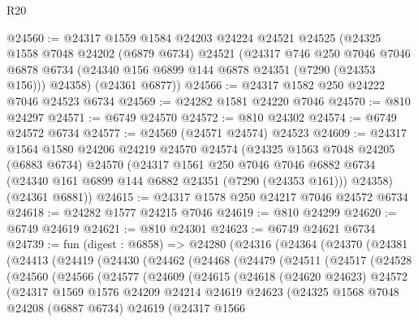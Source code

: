\begin{lexlean}{R20}
\begin{coremodule}
{@24560 := @24317
    @1559
    @1584
    @24203
    @24224
    @24521
    @24525
    (@24325
      @1558
      @7048
      @24202
      (@6879 @6734)
      @24521
      (@24317
        @746
        @250
        @7046
        @7046
        @6878
        @6734
        (@24340 @156 @6899 @144 @6878 @24351 (@7290 (@24353 @156)))
        @24358)
      (@24361 @6877))
@24566 := @24317 @1582 @250 @24222 @7046 @24523 @6734
@24569 := @24282 @1581 @24220 @7046
@24570 := @810 @24297
@24571 := @6749 @24570
@24572 := @810 @24302
@24574 := @6749 @24572 @6734
@24577 := @24569 (@24571 @24574) @24523
@24609 := @24317
    @1564
    @1580
    @24206
    @24219
    @24570
    @24574
    (@24325
      @1563
      @7048
      @24205
      (@6883 @6734)
      @24570
      (@24317
        @1561
        @250
        @7046
        @7046
        @6882
        @6734
        (@24340 @161 @6899 @144 @6882 @24351 (@7290 (@24353 @161)))
        @24358)
      (@24361 @6881))
@24615 := @24317 @1578 @250 @24217 @7046 @24572 @6734
@24618 := @24282 @1577 @24215 @7046
@24619 := @810 @24299
@24620 := @6749 @24619
@24621 := @810 @24301
@24623 := @6749 @24621 @6734
@24739 := fun (digest : @6858) =>
  @24280
    (@24316
      (@24364
        (@24370
          (@24381
            (@24413
              (@24419
                (@24430
                  (@24462
                    (@24468
                      (@24479
                        (@24511
                          (@24517
                            (@24528
                              (@24560
                                (@24566
                                  (@24577
                                    (@24609
                                      (@24615
                                        (@24618
                                          (@24620 @24623)
                                          @24572
                                          (@24317
                                            @1569
                                            @1576
                                            @24209
                                            @24214
                                            @24619
                                            @24623
                                            (@24325
                                              @1568
                                              @7048
                                              @24208
                                              (@6887 @6734)
                                              @24619
                                              (@24317
                                                @1566
}
\end{coremodule}
\end{lexlean}
